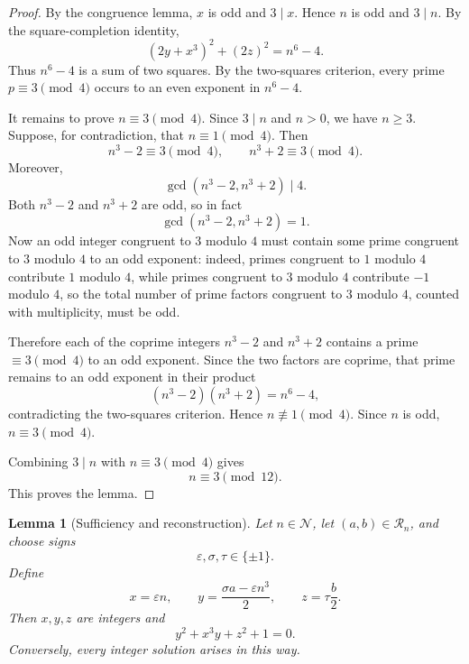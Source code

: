 \documentclass[11pt]{article}
\newtheorem{lemma}[theorem]{Lemma}
\theoremstyle{definition}
\theoremstyle{remark}
\begin{document}
\begin{proof}
By the congruence lemma, $x$ is odd and $3\mid x$.  Hence $n$ is odd and $3\mid n$.  By the square-completion identity,
\[
        (2y+x^3)^2+(2z)^2=n^6-4.
\]
Thus $n^6-4$ is a sum of two squares.  By the two-squares criterion, every prime $p\equiv3\pmod4$ occurs to an even exponent in $n^6-4$.

It remains to prove $n\equiv3\pmod4$.  Since $3\mid n$ and $n>0$, we have $n\ge3$.  Suppose, for contradiction, that $n\equiv1\pmod4$.  Then
\[
        n^3-2\equiv3\pmod4,
        \qquad
        n^3+2\equiv3\pmod4.
\]
Moreover,
\[
        \gcd(n^3-2,n^3+2)\mid4.
\]
Both $n^3-2$ and $n^3+2$ are odd, so in fact
\[
        \gcd(n^3-2,n^3+2)=1.
\]
Now an odd integer congruent to $3$ modulo $4$ must contain some prime congruent to $3$ modulo $4$ to an odd exponent: indeed, primes congruent to $1$ modulo $4$ contribute $1$ modulo $4$, while primes congruent to $3$ modulo $4$ contribute $-1$ modulo $4$, so the total number of prime factors congruent to $3$ modulo $4$, counted with multiplicity, must be odd.

Therefore each of the coprime integers $n^3-2$ and $n^3+2$ contains a prime $\equiv3\pmod4$ to an odd exponent.  Since the two factors are coprime, that prime remains to an odd exponent in their product
\[
        (n^3-2)(n^3+2)=n^6-4,
\]
contradicting the two-squares criterion.  Hence $n\not\equiv1\pmod4$.  Since $n$ is odd, $n\equiv3\pmod4$.

Combining $3\mid n$ with $n\equiv3\pmod4$ gives
\[
        n\equiv3\pmod {12}.
\]
This proves the lemma.
\end{proof}

\begin{lemma}[Sufficiency and reconstruction]
Let $n\in\mathcal N$, let $(a,b)\in\mathcal R_n$, and choose signs
\[
        \varepsilon,\sigma,\tau\in\{\pm1\}.
\]
Define
\[
        x=\varepsilon n,
        \qquad
        y=\frac{\sigma a-\varepsilon n^3}{2},
        \qquad
        z=\tau\frac b2.
\]
Then $x,y,z$ are integers and
\[
        y^2+x^3y+z^2+1=0.
\]
Conversely, every integer solution arises in this way.
\end{lemma}
\end{document}

